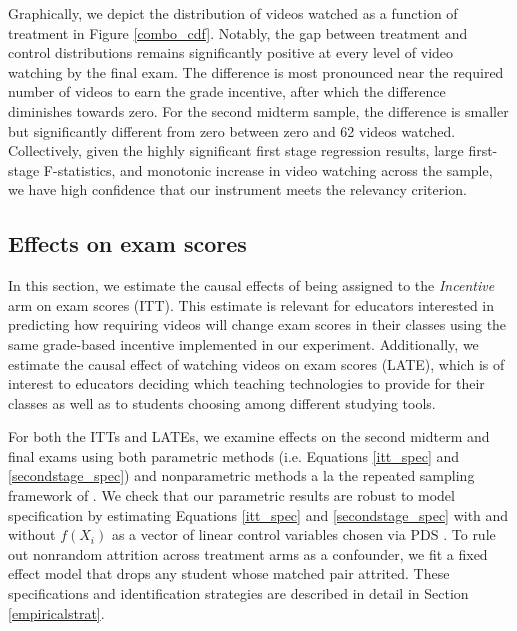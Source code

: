\documentclass[12pt]{article}
\begin{document}
Graphically, we depict the distribution of videos watched as a function of treatment in Figure \ref{combo_cdf}. Notably, the gap between treatment and control distributions remains significantly positive at every level of video watching by the final exam. The difference is most pronounced near the required number of videos to earn the grade incentive, after which the difference diminishes towards zero. For the second midterm sample, the difference is smaller but significantly different from zero between zero and 62 videos watched. Collectively, given the highly significant first stage regression results, large first-stage F-statistics, and monotonic increase in video watching across the sample, we have high confidence that our instrument meets the relevancy criterion.


\subsection{Effects on exam scores}

In this section, we estimate the causal effects of being assigned to the \textit{Incentive} arm on exam scores (ITT). This estimate is relevant for educators interested in predicting how requiring videos will change exam scores in their classes using the same grade-based incentive implemented in our experiment. Additionally, we estimate the causal effect of watching videos on exam scores (LATE), which is of interest to educators deciding which teaching technologies to provide for their classes as well as to students choosing among different studying tools.

For both the ITTs and LATEs, we examine effects on the second midterm and final exams using both parametric methods (i.e. Equations \ref{itt_spec} and \ref{secondstage_spec}) and nonparametric methods a la the repeated sampling framework of \textcite{neyman1923}%
. We check that our parametric results are robust to model specification by estimating Equations \ref{itt_spec} and \ref{secondstage_spec} with and without $f(X_i)$ as a vector of linear control variables chosen via PDS \parencite{bch2014a}. To rule out nonrandom attrition across treatment arms as a confounder, we fit a fixed effect model that drops any student whose matched pair attrited. These specifications and identification strategies are described in detail in Section \ref{empiricalstrat}.
\end{document}
